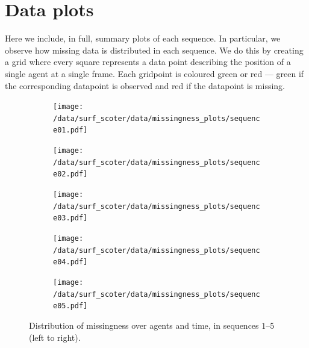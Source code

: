 \fancyhead[RO]{\textsc{\leftmark}\quad\thepage}
\fancyhead[LE]{\thepage\quad\textsc{\appendixname~\thechapter}}

\graphicspath{{fig/data_plots/}}

\chapter{Data plots}
\label{cha:data_plots}

Here we include, in full, summary plots of each sequence. In particular, we observe how missing data is distributed in each sequence. We do this by creating a grid where every square represents a data point describing the position of a single agent at a single frame. Each gridpoint is coloured green or red --- green if the corresponding datapoint is observed and red if the datapoint is missing.

\begin{figure}[h]
	\begin{subfigure}[b]{0.2\textwidth}
		\centering
		\texttt{[image: /data/surf\_scoter/data/missingness\_plots/sequence01.pdf]}
	\end{subfigure}%
	\begin{subfigure}[b]{0.2\textwidth}
		\centering
		\texttt{[image: /data/surf\_scoter/data/missingness\_plots/sequence02.pdf]}
	\end{subfigure}%
	\begin{subfigure}[b]{0.2\textwidth}
		\centering
		\texttt{[image: /data/surf\_scoter/data/missingness\_plots/sequence03.pdf]}
	\end{subfigure}%
	\begin{subfigure}[b]{0.2\textwidth}
		\centering
		\texttt{[image: /data/surf\_scoter/data/missingness\_plots/sequence04.pdf]}
	\end{subfigure}%
	\begin{subfigure}[b]{0.2\textwidth}
		\centering
		\texttt{[image: /data/surf\_scoter/data/missingness\_plots/sequence05.pdf]}
	\end{subfigure}%
	\caption{Distribution of missingness over agents and time, in sequences $1$--$5$ (left to right).}
\end{figure}

